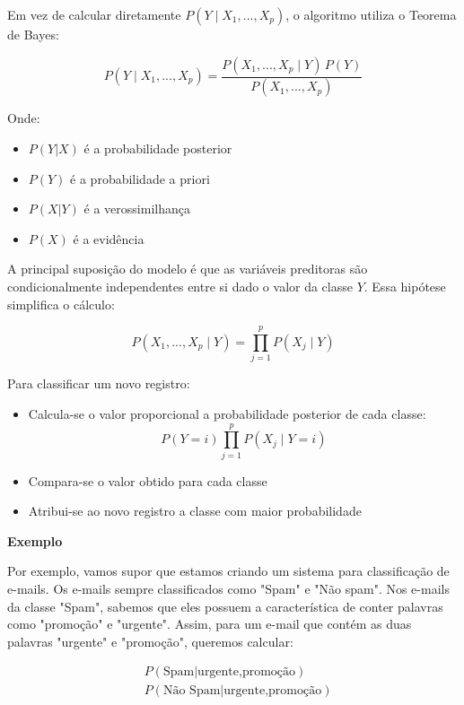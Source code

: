 \documentclass{article}
\begin{document}
Em vez de calcular diretamente $P(Y \mid X_1, ..., X_p)$, o algoritmo utiliza
o Teorema de Bayes:

\begin{equation}
P(Y \mid X_1, ..., X_p) =
\frac{P(X_1, ..., X_p \mid Y)\,P(Y)}{P(X_1, ..., X_p)}
\end{equation}

Onde:

\begin{itemize}
    \item $P(Y|X)$ é a probabilidade posterior 
    \item $P(Y)$ é a probabilidade a priori 
    \item $P(X|Y)$ é a verossimilhança 
    \item $P(X)$ é a evidência 
\end{itemize}

A principal suposição do modelo é que as variáveis preditoras são
condicionalmente independentes entre si dado o valor da classe $Y$.
Essa hipótese simplifica o cálculo:

\begin{equation}
P(X_1, ..., X_p \mid Y)
=
\prod_{j=1}^{p} P(X_j \mid Y)
\end{equation}

Para classificar um novo registro:

\begin{itemize}
    \item Calcula-se  o valor proporcional a probabilidade posterior de cada classe:
    \[
    P(Y=i)\prod_{j=1}^{p} P(X_j \mid Y=i)
    \]
    \item Compara-se o valor obtido para cada classe
    \item Atribui-se ao novo registro a classe com maior probabilidade
\end{itemize}

\textbf{Exemplo}

Por exemplo, vamos supor que estamos criando um sistema para classificação de 
e-mails. Os e-mails sempre classificados como "Spam" e "Não spam". Nos e-mails 
da classe "Spam", sabemos que eles possuem a característica de conter palavras 
como "promoção" e "urgente". Assim, para um e-mail que contém as duas palavras 
"urgente" e "promoção", queremos calcular:

\begin{align*}
    &P(\text{Spam}|\text{urgente,promoção}) \\
    &P(\text{Não Spam}|\text{urgente,promoção})
\end{align*}
\end{document}
